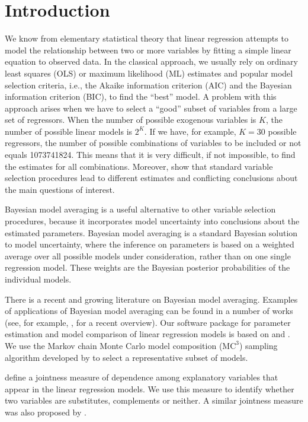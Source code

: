 \section{Introduction}\label{BmaGretlSec1}
We know from elementary statistical theory that linear regression
attempts to model the relationship between two or more variables by
fitting a simple linear equation to observed data. In the classical
approach, we usually rely on ordinary least squares (OLS) or maximum
likelihood (ML) estimates and popular model selection criteria, i.e.,
the Akaike information criterion (AIC) and the Bayesian information
criterion (BIC), to find the ``best'' model. A problem with this
approach arises when we have to select a ``good'' subset of variables
from a large set of regressors. When the number of possible exogenous
variables is $K$, the number of possible linear models is $2^K$.  If
we have, for example, $K=30$ possible regressors, the number of
possible combinations of variables to be included or not equals
1073741824. This means that it is very difficult, if not impossible,
to find the estimates for all combinations. Moreover,
\cite{RafteryMadiganHoeting1997} show that standard variable selection
procedures lead to different estimates and conflicting conclusions
about the main questions of interest.

Bayesian model averaging is a useful alternative to other variable
selection procedures, because it incorporates model uncertainty into
conclusions about the estimated parameters.  Bayesian model averaging
is a standard Bayesian solution to model uncertainty, where the
inference on parameters is based on a weighted average over all
possible models under consideration, rather than on one single
regression model. These weights are the Bayesian posterior
probabilities of the individual models.

There is a recent and growing literature on Bayesian model
averaging. Examples of applications of Bayesian model averaging can be
found in a number of works (see, for example,
\citealt{HoetingMadiganRafteryVolinsky1999}, \citealt{Steel2011} for a
recent overview).  Our software package for parameter estimation and
model comparison of linear regression models is based on
\cite{FernandezLeySteel2001a,FernandezLeySteel2001b} and
\cite{Koop2003}. We use the Markov chain Monte Carlo model composition
($\mbox{MC}^3$) sampling algorithm developed by \cite{MadiganYork1995}
to select a representative subset of models.

\cite{DoppelhoferWeeks2005,DoppelhoferWeeks2009} define a jointness
measure of dependence among explanatory variables that appear in the
linear regression models. We use this measure to identify whether two
variables are substitutes, complements or neither.  A similar
jointness measure was also proposed by \cite{LeySteel2007}.

